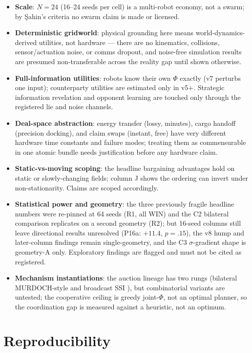 \documentclass[sigconf,nonacm]{acmart}
\begin{document}
\begin{itemize}
\item \textbf{Scale}: $N{=}24$ (16--24 seeds per cell) is a multi-robot
economy, not a swarm; by {\c{S}}ahin's criteria \cite{sahin2005swarm} no
swarm claim is made or licensed.
\item \textbf{Deterministic gridworld}: physical grounding here means
world-dynamics-derived utilities, not hardware --- there are no kinematics,
collisions, sensor/actuation noise, or comms dropout, and noise-free
simulation results are presumed non-transferable across the reality gap
\cite{jakobi1995noise,jakobi1997radical} until shown otherwise.
\item \textbf{Full-information utilities}: robots know their own $\Phi$
exactly (v7 perturbs one input); counterparty utilities are estimated only
in v5+. Strategic information revelation and opponent learning are touched
only through the registered lie and noise channels.
\item \textbf{Deal-space abstraction}: energy transfer (lossy, minutes),
cargo handoff (precision docking), and claim swaps (instant, free) have
very different hardware time constants and failure modes; treating them as
commensurable in one atomic bundle needs justification before any hardware
claim.
\item \textbf{Static-vs-moving scoping}: the headline bargaining advantages
hold on static or slowly-changing fields; column J shows the ordering can
invert under non-stationarity. Claims are scoped accordingly.
\item \textbf{Statistical power and geometry}: the three previously fragile
headline numbers were re-pinned at 64 seeds (R1, all WIN) and the C2
bilateral comparison replicates on a second geometry (R2); but 16-seed
columns still leave directional results unresolved (P16a: $+11.4$,
$p{=}.15$), the v8 hump and later-column findings remain single-geometry,
and the C3 $\sigma$-gradient shape is geometry-A only. Exploratory findings
are flagged and must not be cited as registered.
\item \textbf{Mechanism instantiations}: the auction lineage has two rungs
(bilateral MURDOCH-style and broadcast SSI \cite{koenig2006ssi}), but
combinatorial variants are untested; the cooperative ceiling is greedy
joint-$\Phi$, not an optimal planner, so the coordination gap is measured
against a heuristic, not an optimum.
\end{itemize}

\section{Reproducibility}\label{sec:repro}
\end{document}

